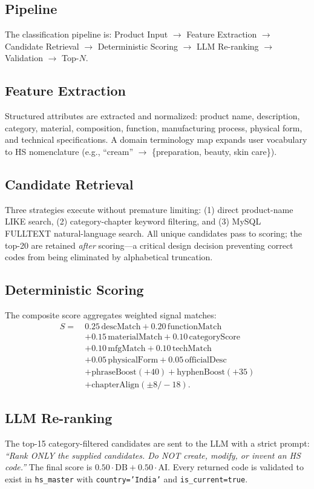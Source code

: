 \documentclass[conference]{IEEEtran}
\newcommand{\arrowto}{$\rightarrow$}
\begin{document}
\subsection{Pipeline}
The classification pipeline is: Product Input \arrowto{} Feature
Extraction \arrowto{} Candidate Retrieval \arrowto{} Deterministic Scoring
\arrowto{} LLM Re-ranking \arrowto{} Validation \arrowto{} Top-$N$.

\subsection{Feature Extraction}
Structured attributes are extracted and normalized: product name,
description, category, material, composition, function, manufacturing
process, physical form, and technical specifications. A domain terminology
map expands user vocabulary to HS nomenclature (e.g., ``cream'' \arrowto{}
\{preparation, beauty, skin care\}).

\subsection{Candidate Retrieval}
Three strategies execute without premature limiting: (1) direct
product-name LIKE search, (2) category-chapter keyword filtering, and (3)
MySQL FULLTEXT natural-language search. All unique candidates pass to
scoring; the top-20 are retained \emph{after} scoring---a critical design
decision preventing correct codes from being eliminated by alphabetical
truncation.

\subsection{Deterministic Scoring}
The composite score aggregates weighted signal matches:
\begin{align*}
S =\ & 0.25\,\text{descMatch} + 0.20\,\text{functionMatch} \\
     & + 0.15\,\text{materialMatch} + 0.10\,\text{categoryScore} \\
     & + 0.10\,\text{mfgMatch} + 0.10\,\text{techMatch} \\
     & + 0.05\,\text{physicalForm} + 0.05\,\text{officialDesc} \\
     & + \text{phraseBoost}(+40) + \text{hyphenBoost}(+35) \\
     & + \text{chapterAlign}(\pm 8/{-}18).
\end{align*}

\subsection{LLM Re-ranking}
The top-15 category-filtered candidates are sent to the LLM with a strict
prompt: \textit{``Rank ONLY the supplied candidates. Do NOT create,
modify, or invent an HS code.''} The final score is
$0.50\cdot\text{DB} + 0.50\cdot\text{AI}$. Every returned code is
validated to exist in \texttt{hs\_master} with \texttt{country='India'}
and \texttt{is\_current=true}.
\end{document}
